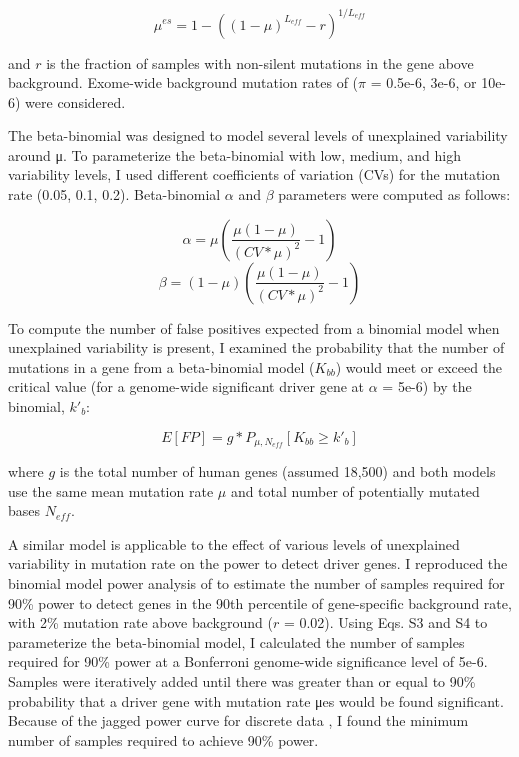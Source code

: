 \begin{equation}
\mu^{es} = 1 - ((1-\mu)^{L_{eff}}-r)^{1/L_{eff}}
\end{equation}

and $r$ is the fraction of samples with non-silent mutations in the gene above background. Exome-wide background mutation rates of ($\pi$ = 0.5e-6, 3e-6, or 10e-6) were considered.

The beta-binomial was designed to model several levels of unexplained variability around μ. To parameterize the beta-binomial with low, medium, and high variability levels, I used different coefficients of variation (CVs) for the mutation rate (0.05, 0.1, 0.2). Beta-binomial $\alpha$ and $\beta$ parameters were computed as follows:

\begin{equation}
\alpha = \mu\left(\frac{\mu(1-\mu)}{(CV*\mu)^2}-1\right)
\end{equation}
\begin{equation}
\beta = (1-\mu)\left(\frac{\mu(1-\mu)}{(CV*\mu)^2}-1\right)
\end{equation}

To compute the number of false positives expected from a binomial model when unexplained variability is present, I examined the probability that the number of mutations in a gene from a beta-binomial model ($K_{bb}$) would meet or exceed the critical value (for a genome-wide significant driver gene at $\alpha$ = 5e-6) by the binomial, $k'_b$:

\begin{equation}
E[FP] = g*P_{\mu,N_{eff}}[K_{bb}\geq k'_b]
\end{equation}

where $g$ is the total number of human genes (assumed 18,500) and both models use the same mean mutation rate $\mu$ and total number of potentially mutated bases $N_{eff}$.

A similar model is applicable to the effect of various levels of unexplained variability in mutation rate on the power to detect driver genes. I reproduced the binomial model power analysis of \cite{RN14} to estimate the number of samples required for 90\% power to detect genes in the 90th percentile of gene-specific background rate, with 2\% mutation rate above background ($r$ = 0.02). Using Eqs. S3 and S4 to parameterize the beta-binomial model, I calculated the number of samples required for 90\% power at a Bonferroni genome-wide significance level of 5e-6. Samples were iteratively added until there was greater than or equal to 90\% probability that a driver gene with mutation rate μes would be found significant. Because of the jagged power curve for discrete data \cite{RN75}, I found the minimum number of samples required to achieve 90\% power.

